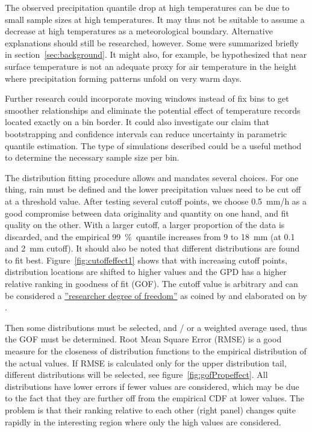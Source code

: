 \documentclass[a4paper]{article}
\begin{document}
\begin{multicols}{2}
The observed precipitation quantile drop at high temperatures can be due to small sample sizes at high temperatures.
It may thus not be suitable to assume a decrease at high temperatures as a meteorological boundary.
Alternative explanations should still be researched, however.
Some were summarized briefly in section~\ref{sec:background}.
It might also, for example, be hypothesized that near surface temperature is not an adequate proxy for air temperature in the height where precipitation forming patterns unfold on very warm days.

Further research could incorporate moving windows instead of fix bins to get smoother relationships and eliminate the potential effect of temperature records located exactly on a bin border.
It could also investigate our claim that bootstrapping and confidence intervals can reduce uncertainty in parametric quantile estimation.
The type of simulations described could be a useful method to determine the necessary sample size per bin.

The distribution fitting procedure allows and mandates several choices. 
For one thing, rain must be defined and the lower precipitation values need to be cut off at a threshold value.
After testing several cutoff points, we choose 0.5~mm/h as a good compromise between data originality and quantity on one hand, and fit quality on the other.
With a larger cutoff, a larger proportion of the data is discarded, and the empirical 99~\%~quantile increases from 9 to 18~mm (at 0.1 and 2~mm cutoff).
It should also be noted that different distributions are found to fit best.
Figure~\ref{fig:cutoffeffect1} shows that with increasing cutoff points, distribution locations are shifted to higher values and the GPD has a higher relative ranking in goodness of fit (GOF).
The cutoff value is arbitrary and can be considered a \href{http://andrewgelman.com/2012/11/01/researcher-degrees-of-freedom}{''researcher degree of freedom''} as coined by \citet{simmons_false-positive_2011} and elaborated on by \citet{gelman_garden_2013}. 

Then some distributions must be selected, and / or a weighted average used, thus the GOF must be determined.
Root Mean Square Error (RMSE) is a good measure for the closeness of distribution functions to the empirical distribution of the actual values.
If RMSE is calculated only for the upper distribution tail, different distributions will be selected, see
figure~\ref{fig:gofPropeffect}.
All distributions have lower errors if fewer values are considered, which may be due to the fact that they are further off from the empirical CDF at lower values. 
The problem is that their ranking relative to each other (right panel) changes quite rapidly in the interesting region where only the high values are considered.

\end{multicols}
\end{document}
